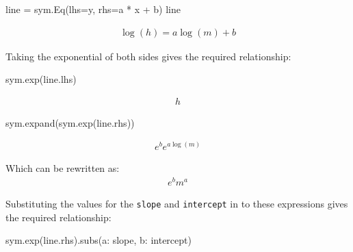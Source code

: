 \begin{pyin}
line = sym.Eq(lhs=y, rhs=a * x + b)
line
\end{pyin}




\begin{equation*}
\begin{split}\displaystyle \log{\left(h \right)} = a \log{\left(m \right)} + b\end{split}
\end{equation*}




Taking the exponential of both sides gives the required relationship:




\begin{pyin}
sym.exp(line.lhs)
\end{pyin}




\begin{equation*}
\begin{split}\displaystyle h\end{split}
\end{equation*}






\begin{pyin}
sym.expand(sym.exp(line.rhs))
\end{pyin}




\begin{equation*}
\begin{split}\displaystyle e^{b} e^{a \log{\left(m \right)}}\end{split}
\end{equation*}




Which can be rewritten as:
\begin{equation*}
\begin{split}
e^bm^a
\end{split}
\end{equation*}

Substituting the values for the \texttt{slope} and \texttt{intercept} in to these expressions
gives the required relationship:




\begin{pyin}
sym.exp(line.rhs).subs({a: slope, b: intercept})
\end{pyin}




